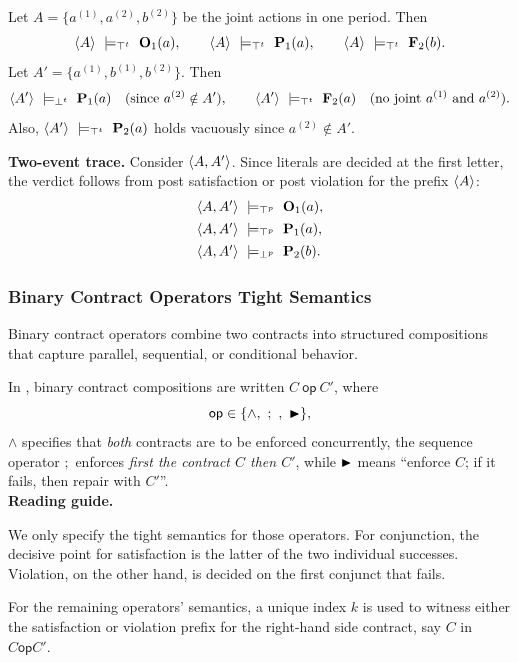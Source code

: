 \begin{example}
Let $A=\{a^{(1)},a^{(2)},b^{(2)}\}$ be the joint actions in one period.
Then
\[
\trace{A}\ \satt\ \obl[1]{a},\qquad
\trace{A}\ \satt\ \perm[1]{a},\qquad
\trace{A}\ \satt\ \frb[2]{b}.
\]
Let $A'=\{a^{(1)},b^{(1)},b^{(2)}\}$. Then
\[
\trace{A'}\ \violt\ \perm[1]{a}\quad\text{(since $a^{(2)}\notin A'$)},\qquad
\trace{A'}\ \satt\ \frb[2]{a}\quad\text{(no joint $a^{(1)} \nd a^{(2)}$).}
\]
Also, $\trace{A'}\ \satt\ \perm[2]{a}$ holds vacuously since $a^{(2)}\notin A'$.

\medskip
\noindent\textbf{Two-event trace.}
Consider $\trace{A,A'}$.
Since literals are decided at the first letter, the verdict follows from post satisfaction or post violation for the prefix $\trace{A}$:
\[
\begin{array}{l}
\trace{A,A'}\ \postsat\ \obl[1]{a},\\[4pt]
\trace{A,A'}\ \postsat\ \perm[1]{a},\\[4pt]
\trace{A,A'}\ \postviol\ \perm[2]{b}.
\end{array}
\]
\end{example}

\subsubsection*{Binary Contract Operators Tight Semantics}



\label{sec:tight-binary}
Binary contract operators combine two contracts into structured compositions that capture
parallel, sequential, or conditional behavior.  

In \cDL, binary contract compositions  are written $C~\textsf{op}~C'$, where
\[
\textsf{op} \in \{\wedge,\ ;\ ,\ \repair\},
\]
$\wedge$ specifies that \emph{both} contracts are to be enforced concurrently, the sequence operator $;$ enforces \emph{first the contract $C$ then $C'$}, while $\repair$ means ``enforce $C$; if it fails, then repair with $C'$''.\\
\noindent\textbf{Reading guide.}

We only specify the tight semantics for those operators.   For conjunction, the decisive point for satisfaction is the latter of the two individual successes. Violation, on the other hand, is decided on the first conjunct that fails.

For the remaining operators' semantics, a unique index $k$ is used to witness either the satisfaction or violation prefix for the right-hand side contract, say $C$ in $C \textsf{op} C'$.

